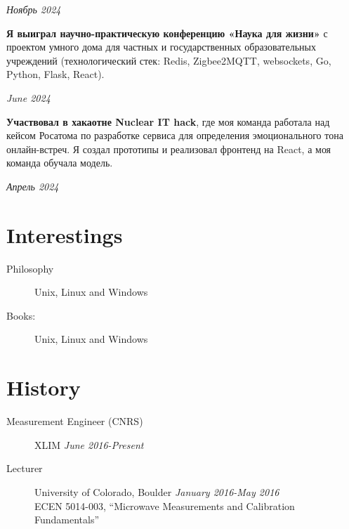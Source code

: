 \documentclass[margin,line]{resume}
\begin{document}
\begin{resume}
  \vspace{-6mm}

  \hfill \textsl{Ноябрь 2024}

      \textbf{Я выиграл научно-практическую конференцию «Наука для жизни»} с проектом умного дома для частных и государственных образовательных учреждений (технологический стек: Redis, Zigbee2MQTT, websockets, Go, Python, Flask, React).
    \vspace{-6mm}

    \hfill \textsl{June 2024}

  \textbf{Участвовал в хакаотне Nuclear IT hack}, где моя команда
    работала над кейсом Росатома по разработке сервиса для определения
    эмоционального тона онлайн-встреч. Я создал
    прототипы и реализовал фронтенд на React, а моя команда
    обучала модель.

    \vspace{-6mm}

    \hfill \textsl{Апрель 2024}

    \section{\mysidestyle Interestings}\vspace{2mm}
    \begin{description}
      \item[Philosophy] Unix, Linux and Windows
      \item[Books:] Unix, Linux and Windows
    \end{description}

    \vfill

    \section{\mysidestyle History}\vspace{2mm}

    \begin{description}

      \item[Measurement Engineer (CNRS)]\small{XLIM \hfill \textsl{June
        2016-Present}}\\
      \item[Lecturer]\small{University of Colorado, Boulder \hfill
        \textsl{January 2016-May 2016}}\\
        ECEN 5014-003, ``Microwave Measurements and Calibration Fundamentals''
        \vspace{2mm}


\end{description}
\end{resume}
\end{document}
